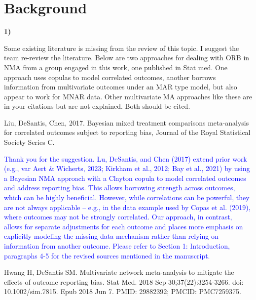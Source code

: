 \documentclass{article}
\begin{document}
\section*{Background}

\textbf{1)}

\bigskip

Some existing literature is missing from the review of this topic. I suggest the team re-review the literature. Below are two approaches for dealing with ORB in NMA from a group engaged in this work, one published in Stat med. One approach uses copulas to model correlated outcomes, another borrows information from multivariate outcomes under an MAR type model, but also appear to work for MNAR data. Other multivariate MA approaches like these are in your citations but are not explained. Both should be cited. 

\bigskip

Liu, DeSantis, Chen, 2017. Bayesian mixed treatment comparisons meta-analysis for correlated outcomes subject to reporting bias, Journal of the Royal Statistical Society Series C. 

\bigskip

\textcolor{blue}{Thank you for the suggestion. Lu, DeSantis, and Chen (2017) extend prior work (e.g., var Aert \& Wicherts, 2023; Kirkham et al., 2012; Bay et al., 2021) by using a Bayesian NMA approach with a Clayton copula to model correlated outcomes and address reporting bias. This allows borrowing strength across outcomes, which can be highly beneficial. However, while correlations can be powerful, they are not always applicable – e.g., in the data example used by Copas et al. (2019), where outcomes may not be strongly correlated. Our approach, in contrast, allows for separate adjustments for each outcome and places more emphasis on explicitly modeling the missing data mechanism rather than relying on information from another outcome. Please refer to Section 1: Introduction, paragraphs 4-5 for the revised sources mentioned in the manuscript.}

\bigskip

Hwang H, DeSantis SM. Multivariate network meta-analysis to mitigate the effects of outcome reporting bias. Stat Med. 2018 Sep 30;37(22):3254-3266. doi: 10.1002/sim.7815. Epub 2018 Jun 7. PMID: 29882392; PMCID: PMC7259375. 

\bigskip
\end{document}
